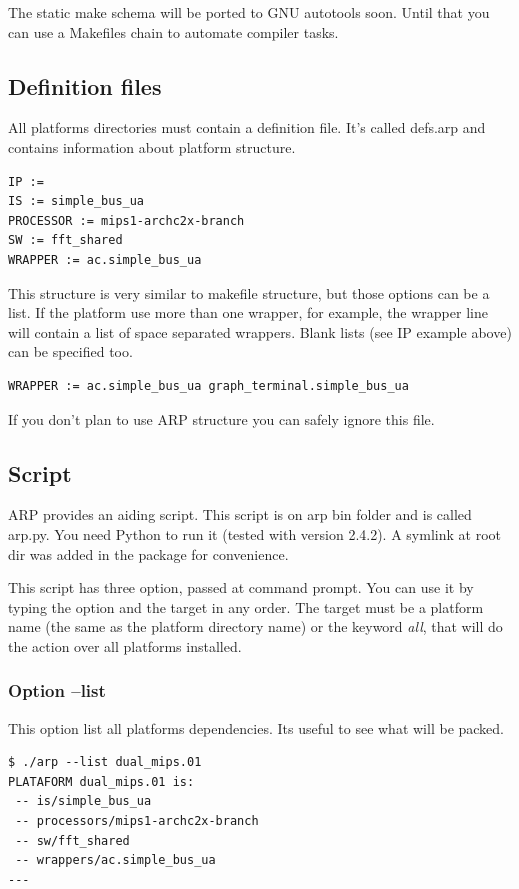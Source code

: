 \documentclass[12pt]{article}
\begin{document}
The static make schema will be ported to GNU autotools soon. Until
that you can use a Makefiles chain to automate compiler tasks.

\subsection{Definition files}

All platforms directories must contain a definition file. It's called defs.arp and contains information about platform structure.

\begin{verbatim}
IP :=
IS := simple_bus_ua
PROCESSOR := mips1-archc2x-branch
SW := fft_shared
WRAPPER := ac.simple_bus_ua
\end{verbatim}

This structure is very similar to makefile structure, but those options can be a list. If the platform use more than one wrapper, for example, the wrapper line will contain a list of space separated wrappers. Blank lists (see IP example above) can be specified too.

\begin{verbatim}
WRAPPER := ac.simple_bus_ua graph_terminal.simple_bus_ua
\end{verbatim}

If you don't plan to use ARP structure you can safely ignore this file.

\subsection{Script}
ARP provides an aiding script. This script is on arp bin folder and is called arp.py. You need Python to run it (tested with version 2.4.2). A symlink at root dir was added in the package for convenience.

This script has three option, passed at command prompt. You can use it by typing the option and the target in any order. The target must be a platform name (the same as the platform directory name) or the keyword \emph{all}, that will do the action over all platforms installed.

\subsubsection{Option --list}
This option list all platforms dependencies. Its useful to see what will be packed.

\begin{verbatim}
$ ./arp --list dual_mips.01
PLATAFORM dual_mips.01 is:
 -- is/simple_bus_ua
 -- processors/mips1-archc2x-branch
 -- sw/fft_shared
 -- wrappers/ac.simple_bus_ua
---
\end{verbatim}
\end{document}

